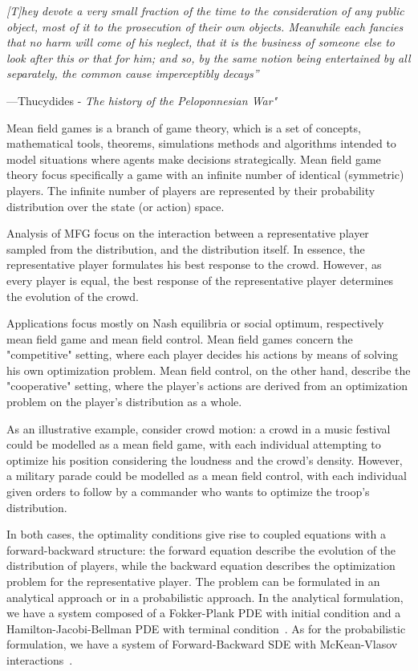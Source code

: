 
 
\epigraph{\itshape [T]hey devote a very small fraction of the time to the consideration of any public object, most of it to the prosecution of their own objects. Meanwhile each fancies that no harm will come of his neglect, that it is the business of someone else to look after this or that for him; and so, by the same notion being entertained by all separately, the common cause imperceptibly decays''}{---Thucydides - \textit{The history of the Peloponnesian War"}}
 

Mean field games is a branch of game theory, which is a set of concepts, mathematical tools, theorems, simulations methods and algorithms intended to model situations where agents make decisions strategically. Mean field game theory focus specifically a game with an infinite number of identical (symmetric) players. The infinite number of players are represented by their probability distribution over the state (or action) space.

Analysis of MFG focus on the interaction between a representative player sampled from the distribution, and the distribution itself. In essence, the representative player formulates his best response to the crowd. However, as every player is equal, the best response of the representative player determines the evolution of the crowd.


Applications focus mostly on Nash equilibria or social optimum, respectively mean field game and mean field control.
Mean field games concern the "competitive" setting, where each player decides his actions by means of solving  his own optimization problem. Mean field control, on the other hand, describe the "cooperative" setting, where the player's actions are derived from an optimization problem on the player's distribution as a whole. 

As an illustrative example, consider crowd motion: a crowd in a music festival could be modelled as a mean field game, with each individual attempting to optimize his position considering the loudness and the crowd's density. However, a military parade could be modelled as a mean field control, with each individual given orders to follow by a commander who wants to optimize the troop's distribution. 

In both cases, the optimality conditions give rise to coupled equations with a forward-backward structure: the forward equation describe the evolution of the distribution of players, while the backward equation describes the optimization problem for the representative player. The problem can be formulated in an analytical approach or in a probabilistic approach. 
In the analytical formulation, we have a system composed of a Fokker-Plank PDE with initial condition and a Hamilton-Jacobi-Bellman PDE with terminal condition~\cite{lasry2007mean}.
As for the probabilistic formulation, we have a system of Forward-Backward SDE with McKean-Vlasov interactions~\cite{carmona2013mean}. 

